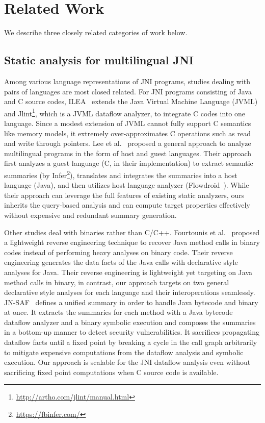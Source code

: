 \section{Related Work}\label{sec:related}
We describe three closely related categories of work below.
\subsection{Static analysis for multilingual JNI}
Among various language representations of JNI programs, studies dealing with
pairs of languages are most closed related.  For JNI programs consisting of
Java and C source codes, ILEA~\cite{ILEA} extends the Java Virtual Machine
Language (JVML) and Jlint\footnote{\url{http://artho.com/jlint/manual.html}},
which is a JVML dataflow analyzer, to integrate C codes into one language.
Since a modest extension of JVML cannot fully support C semantics like memory
models, it extremely over-approximates C operations such as read and write
through pointers.  Lee et al.~\cite{LeeASE20} proposed a general approach to
analyze multilingual programs in the form of host and guest languages.  Their
approach first analyzes a guest language (C, in their implementation) to extract
semantic summaries (by Infer\footnote{\url{https://fbinfer.com/}}), translates
and integrates the summaries into a host language (Java), and then utilizes host
language analyzer (Flowdroid~\cite{Flowdroid}).  While their approach can
leverage the full features of existing static analyzers, ours inherits the
query-based analysis and can compute target properties effectively without
expensive and redundant summary generation.

Other studies deal with binaries rather than C/C++.
Fourtounis et al.~\cite{scanning} proposed a lightweight reverse engineering
technique to recover Java method calls in binary codes instead of performing
heavy analyses on binary code.  Their reverse engineering generates the data
facts of the Java calls with declarative style analyses for Java.
Their reverse engineering is lightweight yet targeting on Java method calls in
binary, in contrast, our approach targets on two general declarative style
analyses for each language and their interoperations seamlessly.
JN-SAF~\cite{JN-SAF} defines a unified summary in order to handle Java bytecode
and binary at once.  It extracts the summaries for each method with a Java
bytecode dataflow analyzer and a binary symbolic execution and composes the
summaries in a bottom-up manner to detect security vulnerabilities.
It sacrifices propagating dataflow facts until a fixed point by breaking a cycle
in the call graph arbitrarily to mitigate expensive computations from the
dataflow analysis and symbolic execution.  Our approach is scalable for the JNI
dataflow analysis even without sacrificing fixed point computations when C
source code is available.

